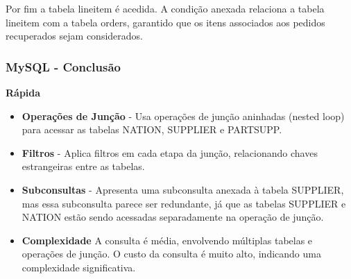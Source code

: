 \documentclass{article}
\begin{document}
Por fim a tabela lineitem é acedida. A condição anexada relaciona a tabela lineitem com a tabela orders, garantido que os itens associados aos pedidos recuperados sejam considerados.
\subsubsection{MySQL - Conclusão}

  \textbf{Rápida}\\
  \begin{itemize}
    \item \textbf{Operações de Junção} - Usa operações de junção aninhadas (nested loop) para acessar as tabelas NATION, SUPPLIER e PARTSUPP.
    \item \textbf{Filtros} - Aplica filtros em cada etapa da junção, relacionando chaves estrangeiras entre as tabelas.
    \item \textbf{Subconsultas} - Apresenta uma subconsulta anexada à tabela SUPPLIER, mas essa subconsulta parece ser redundante, já que as tabelas SUPPLIER e NATION estão sendo acessadas separadamente na operação de junção.
    \item\textbf{Complexidade} A consulta é média, envolvendo múltiplas tabelas e operações de junção. O custo da consulta é muito alto, indicando uma complexidade significativa.
  \end{itemize}
  
\end{document}
